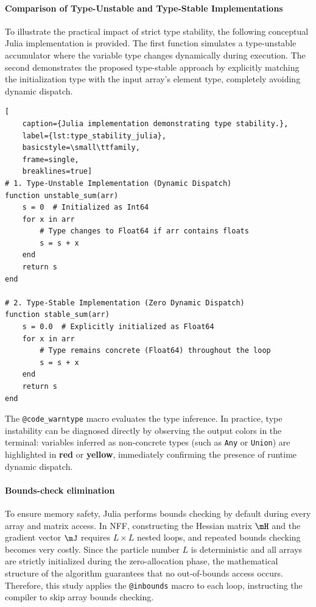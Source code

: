 \paragraph{Comparison of Type-Unstable and Type-Stable Implementations}
To illustrate the practical impact of strict type stability, the following conceptual Julia implementation is provided. The first function simulates a type-unstable accumulator where the variable type changes dynamically during execution. The second demonstrates the proposed type-stable approach by explicitly matching the initialization type with the input array's element type, completely avoiding dynamic dispatch.
\clearpage
\begin{lstlisting}[
    caption={Julia implementation demonstrating type stability.},
    label={lst:type_stability_julia},
    basicstyle=\small\ttfamily,
    frame=single,
    breaklines=true]
# 1. Type-Unstable Implementation (Dynamic Dispatch)
function unstable_sum(arr)
    s = 0  # Initialized as Int64
    for x in arr
        # Type changes to Float64 if arr contains floats
        s = s + x  
    end
    return s
end

# 2. Type-Stable Implementation (Zero Dynamic Dispatch)
function stable_sum(arr)
    s = 0.0  # Explicitly initialized as Float64
    for x in arr
        # Type remains concrete (Float64) throughout the loop
        s = s + x  
    end
    return s
end
\end{lstlisting}

\begin{Remark}
The \texttt{@code\_warntype} macro evaluates the type inference. In practice, type instability can be diagnosed directly by observing the output colors in the terminal: variables inferred as non-concrete types (such as \texttt{Any} or \texttt{Union}) are highlighted in \textbf{red} or \textbf{yellow}, immediately confirming the presence of runtime dynamic dispatch.
\end{Remark}

\paragraph{Bounds-check elimination} To ensure memory safety, Julia performs bounds checking by default during every array and matrix access. In NFF, constructing the Hessian matrix $\mH$ and the gradient vector $\mJ$ requires $L \times L$ nested loops, and repeated bounds checking becomes very costly. Since the particle number $L$ is deterministic and all arrays are strictly initialized during the zero-allocation phase, the mathematical structure of the algorithm guarantees that no out-of-bounds access occurs. Therefore, this study applies the \texttt{@inbounds} macro to each loop, instructing the compiler to skip array bounds checking.

